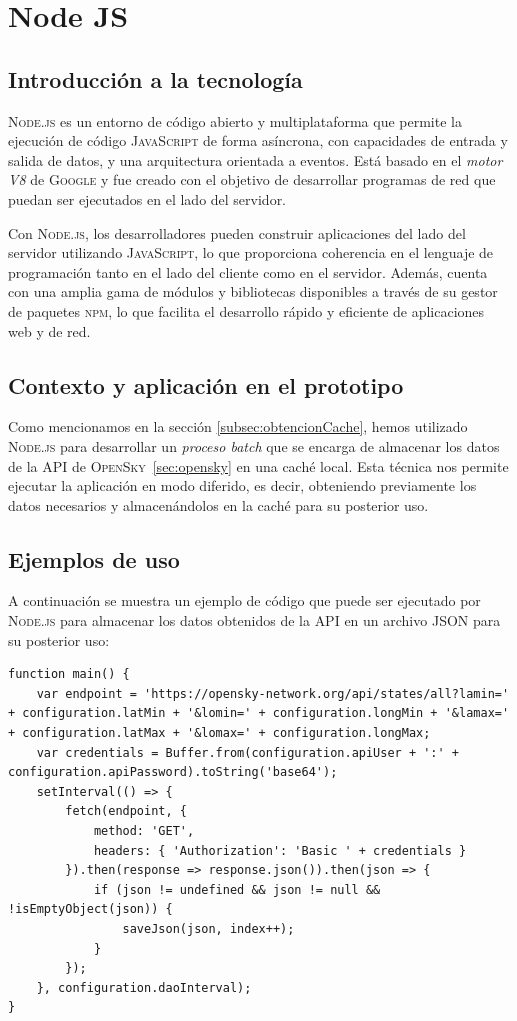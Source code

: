 \documentclass[a4paper, 11pt]{book}
\begin{document}
\section{Node JS}
\subsection{Introducción a la tecnología}
\textsc{Node.js} es un entorno de código abierto y multiplataforma que permite la ejecución de código \textsc{JavaScript} de forma asíncrona, con capacidades de entrada y salida de datos, y una arquitectura orientada a eventos. Está basado en el \emph{motor V8} de \textsc{Google} y fue creado con el objetivo de desarrollar programas de red que puedan ser ejecutados en el lado del servidor.

Con \textsc{Node.js}, los desarrolladores pueden construir aplicaciones del lado del servidor utilizando \textsc{JavaScript}, lo que proporciona coherencia en el lenguaje de programación tanto en el lado del cliente como en el servidor. Además, cuenta con una amplia gama de módulos y bibliotecas disponibles a través de su gestor de paquetes \textsc{npm}, lo que facilita el desarrollo rápido y eficiente de aplicaciones web y de red.
\subsection{Contexto y aplicación en el prototipo}
Como mencionamos en la sección \ref{subsec:obtencionCache}, hemos utilizado \textsc{Node.js} para desarrollar un \emph{proceso batch} que se encarga de almacenar los datos de la \textsc{API} de \textsc{OpenSky}~\ref{sec:opensky} en una caché local. Esta técnica nos permite ejecutar la aplicación en modo diferido, es decir, obteniendo previamente los datos necesarios y almacenándolos en la caché para su posterior uso.
\subsection{Ejemplos de uso}
A continuación se muestra un ejemplo de código que puede ser ejecutado por \textsc{Node.js} para almacenar los datos obtenidos de la \textsc{API} en un archivo \textsc{JSON} para su posterior uso:
\begin{verbatim}
function main() {
    var endpoint = 'https://opensky-network.org/api/states/all?lamin=' + configuration.latMin + '&lomin=' + configuration.longMin + '&lamax=' + configuration.latMax + '&lomax=' + configuration.longMax;
    var credentials = Buffer.from(configuration.apiUser + ':' + configuration.apiPassword).toString('base64');
    setInterval(() => {
        fetch(endpoint, {
            method: 'GET',
            headers: { 'Authorization': 'Basic ' + credentials }
        }).then(response => response.json()).then(json => {
            if (json != undefined && json != null && !isEmptyObject(json)) {
                saveJson(json, index++);
            }
        });
    }, configuration.daoInterval);
}
\end{verbatim}
\label{sec:nodejs}
\end{document}
